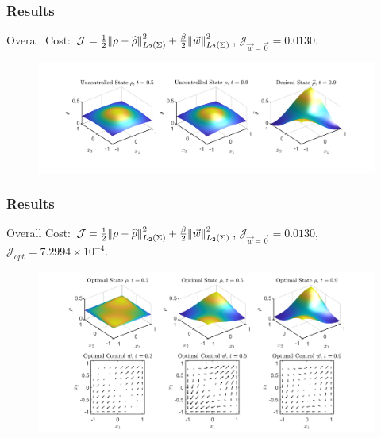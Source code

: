 \documentclass[aspectratio=169,xcolor=dvipsnames]{beamer}
\begin{document}
\begin{frame}
	\frametitle{Results}
	Overall Cost: $\mathcal J = \frac{1}{2}\norm{\rho- \widehat{\rho}}_{L_2(\Sigma)}^2 + \frac{\beta}{2} \norm{\vec{w}}_{L_2(\Sigma)}^2$, $\mathcal J_{\vec{w}= \vec 0} = 0.0130$.

	\begin{figure}
		\includegraphics[width=15cm]{Res1Ex2.png}
	\end{figure}
	
\end{frame}

\begin{frame}
	\frametitle{Results}
	\vspace{0.3cm}
	Overall Cost: $\mathcal J = \frac{1}{2}\norm{\rho- \widehat{\rho}}_{L_2(\Sigma)}^2 + \frac{\beta}{2} \norm{\vec{w}}_{L_2(\Sigma)}^2$, $\mathcal J_{\vec{w} = \vec 0} = 0.0130$, $\mathcal J_{opt} = 7.2994 \times 10^{-4}$.
	\begin{figure}
		\includegraphics[width=14cm]{Res2Ex2.png}
	\end{figure}
\end{frame}
\end{document}
